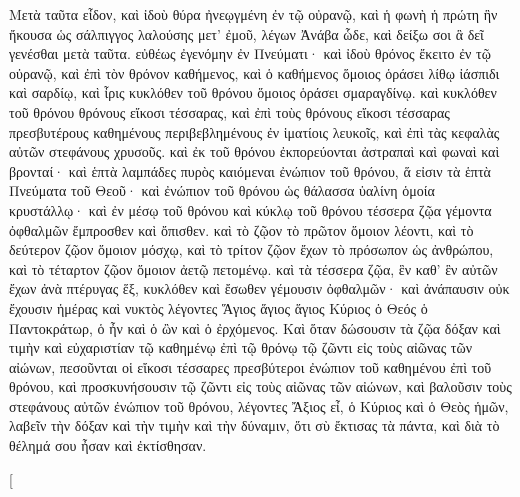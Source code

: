\begin{pages}
    \begin{Rightside}
        \beginnumbering
		Μετὰ ταῦτα εἶδον, καὶ ἰδοὺ θύρα ἠνεῳγμένη ἐν τῷ οὐρανῷ, καὶ ἡ φωνὴ ἡ πρώτη ἣν ἤκουσα ὡς σάλπιγγος λαλούσης μετ’ ἐμοῦ, λέγων Ἀνάβα ὧδε, καὶ δείξω σοι ἃ δεῖ γενέσθαι μετὰ ταῦτα. εὐθέως ἐγενόμην ἐν Πνεύματι· καὶ ἰδοὺ θρόνος ἔκειτο ἐν τῷ οὐρανῷ, καὶ ἐπὶ τὸν θρόνον καθήμενος, καὶ ὁ καθήμενος ὅμοιος ὁράσει λίθῳ ἰάσπιδι καὶ σαρδίῳ, καὶ ἶρις κυκλόθεν τοῦ θρόνου ὅμοιος ὁράσει σμαραγδίνῳ. καὶ κυκλόθεν τοῦ θρόνου θρόνους εἴκοσι τέσσαρας, καὶ ἐπὶ τοὺς θρόνους εἴκοσι τέσσαρας πρεσβυτέρους καθημένους περιβεβλημένους ἐν ἱματίοις λευκοῖς, καὶ ἐπὶ τὰς κεφαλὰς αὐτῶν στεφάνους χρυσοῦς. καὶ ἐκ τοῦ θρόνου ἐκπορεύονται ἀστραπαὶ καὶ φωναὶ καὶ βρονταί· καὶ ἑπτὰ λαμπάδες πυρὸς καιόμεναι ἐνώπιον τοῦ θρόνου, ἅ εἰσιν τὰ ἑπτὰ Πνεύματα τοῦ Θεοῦ· καὶ ἐνώπιον τοῦ θρόνου ὡς θάλασσα ὑαλίνη ὁμοία κρυστάλλῳ·
		\pend
		\pstart
		καὶ ἐν μέσῳ τοῦ θρόνου καὶ κύκλῳ τοῦ θρόνου τέσσερα ζῷα γέμοντα ὀφθαλμῶν ἔμπροσθεν καὶ ὄπισθεν. καὶ τὸ ζῷον τὸ πρῶτον ὅμοιον λέοντι, καὶ τὸ δεύτερον ζῷον ὅμοιον μόσχῳ, καὶ τὸ τρίτον ζῷον ἔχων τὸ πρόσωπον ὡς ἀνθρώπου, καὶ τὸ τέταρτον ζῷον ὅμοιον ἀετῷ πετομένῳ. καὶ τὰ τέσσερα ζῷα, ἓν καθ’ ἓν αὐτῶν ἔχων ἀνὰ πτέρυγας ἕξ, κυκλόθεν καὶ ἔσωθεν γέμουσιν ὀφθαλμῶν· καὶ ἀνάπαυσιν οὐκ ἔχουσιν ἡμέρας καὶ νυκτὸς λέγοντες Ἅγιος ἅγιος ἅγιος Κύριος ὁ Θεός ὁ Παντοκράτωρ, ὁ ἦν καὶ ὁ ὢν καὶ ὁ ἐρχόμενος. 
		\pend
		\pstart
		Καὶ ὅταν δώσουσιν τὰ ζῷα δόξαν καὶ τιμὴν καὶ εὐχαριστίαν τῷ καθημένῳ ἐπὶ τῷ θρόνῳ τῷ ζῶντι εἰς τοὺς αἰῶνας τῶν αἰώνων, πεσοῦνται οἱ εἴκοσι τέσσαρες πρεσβύτεροι ἐνώπιον τοῦ καθημένου ἐπὶ τοῦ θρόνου, καὶ προσκυνήσουσιν τῷ ζῶντι εἰς τοὺς αἰῶνας τῶν αἰώνων, καὶ βαλοῦσιν τοὺς στεφάνους αὐτῶν ἐνώπιον τοῦ θρόνου, λέγοντες Ἄξιος εἶ, ὁ Κύριος καὶ ὁ Θεὸς ἡμῶν, λαβεῖν τὴν δόξαν καὶ τὴν τιμὴν καὶ τὴν δύναμιν, ὅτι σὺ ἔκτισας τὰ πάντα, καὶ διὰ τὸ θέλημά σου ἦσαν καὶ ἐκτίσθησαν.
		\pend
        \endnumbering
    \end{Rightside}
    \begin{Leftside}
        \beginnumbering
        \pstart[

\end{Leftside}
\end{pages}
